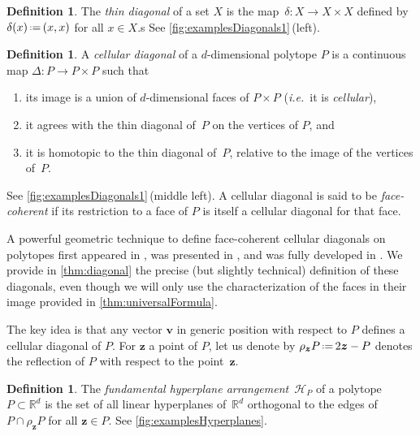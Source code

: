 \documentclass{amsart}
\newcommand{\darkblue}{\color{darkblue}} %
\theoremstyle{definition}
\newtheorem{definition}[theorem]{Definition}
\newcommand{\R}{\mathbb{R}} %
\renewcommand{\b}[1]{{\boldsymbol{#1}}} %
\newcommand{\eqdef}{\mbox{\,\raisebox{0.2ex}{\scriptsize\ensuremath{\mathrm:}}\ensuremath{=}\,}} %
\newcommand{\ie}{\textit{i.e.}~} %
\newcommand{\defn}[1]{\textsl{\darkblue #1}} %
\renewcommand{\b}[1]{\boldsymbol{#1}} %
\begin{document}
\begin{definition} 
\label{def:thinDiagonal}
The \defn{thin diagonal} of a set $X$ is the map~$\delta : X \to X \times X$ defined by $\delta(x) \eqdef (x,x)$ for all $x \in X$.s
See \cref{fig:examplesDiagonals1}\,(left).
\end{definition}

\begin{definition} 
\label{def:cellularDiagonal}
A \defn{cellular diagonal} of a $d$-dimensional polytope $P$ is a continuous map ${\Delta : P \to P \times P}$ such that
\begin{enumerate}
\item its image is a union of $d$-dimensional faces of $P\times P$ (\ie it is \defn{cellular}),
\item it agrees with the thin diagonal of~$P$ on the vertices of $P$, and
\item it is homotopic to the thin diagonal of~$P$, relative to the image of the vertices of~$P$. 
\end{enumerate}
See \cref{fig:examplesDiagonals1}\,(middle left).
A cellular diagonal is said to be \defn{face-coherent} if its restriction to a face of $P$ is itself a cellular diagonal for that face. 
\end{definition}

A powerful geometric technique to define face-coherent cellular diagonals on polytopes first appeared in \cite{FultonSturmfels}, was presented in \cite{MasudaThomasTonksVallette}, and was fully developed in \cite{LaplanteAnfossi}.
We provide in \cref{thm:diagonal} the precise (but slightly technical) definition of these diagonals, even though we will only use the characterization of the faces in their image provided in \cref{thm:universalFormula}.

The key idea is that any vector $\b{v}$ in generic position with respect to $P$ defines a cellular diagonal of $P$.
For $\b{z}$ a point of $P$, let us denote by $\rho_{\b{z}} P \eqdef 2\b{z}-P$ denotes the reflection of $P$ with respect to the point~$\b{z}$.

\begin{definition}
	The \defn{fundamental hyperplane arrangement}~$\mathcal{H}_P$ of a polytope~$P \subset \R^d$ is the set of all linear hyperplanes of~$\R^d$ orthogonal to the edges of $P\cap \rho_{\b{z}} P$ for all $\b{z} \in P$. 
	See \cref{fig:examplesHyperplanes}.
\end{definition}
\end{document}
